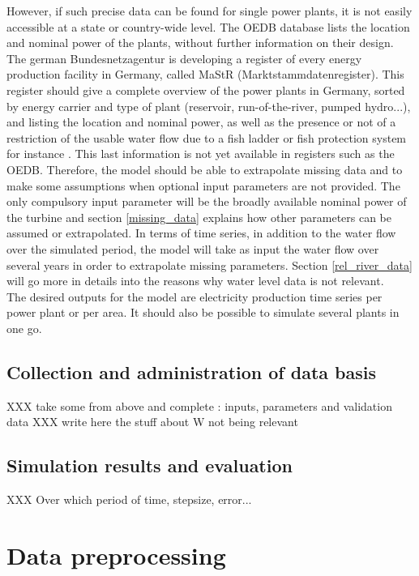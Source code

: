 However, if such precise data can be found for single power plants, it is not easily accessible at a state or country-wide level. The OEDB database lists the location and nominal power of the plants, without further information on their design. The german Bundesnetzagentur is developing a register of every energy production facility in Germany, called MaStR (Marktstammdatenregister). This register should give a complete overview of the power plants in Germany, sorted by energy carrier and type of plant (reservoir, run-of-the-river, pumped hydro...), and listing the location and nominal power, as well as the presence or not of a restriction of the usable water flow due to a fish ladder or fish protection system for instance \cite{MaStR}. This last information is not yet available in registers such as the OEDB.\newline
Therefore, the model should be able to extrapolate missing data and to make some assumptions when optional input parameters are not provided. The only compulsory input parameter will be the broadly available nominal power of the turbine and section \ref{missing_data} explains how other parameters can be assumed or extrapolated. \newline
In terms of time series, in addition to the water flow over the simulated period, the model will take as input the water flow over several years in order to extrapolate missing parameters. Section \ref{rel_river_data} will go more in details into the reasons why water level data is not relevant. \\
The desired outputs for the model are electricity production time series per power plant or per area. It should also be possible to simulate several plants in one go.

\subsection{Collection and administration of data basis}
XXX take some from above and complete : inputs, parameters and validation data
XXX write here the stuff about W not being relevant

\subsection{Simulation results and evaluation}
XXX Over which period of time, stepsize, error...

\section{Data preprocessing}

